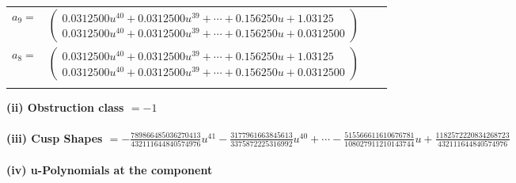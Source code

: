 \documentclass[1p]{elsarticle_modified}
\theoremstyle{definition}
\begin{document}
\begin{tabular}{m{7pt} m{180pt} m{7pt} m{180pt} }
\flushright $a_{9}=$&$\begin{pmatrix}0.0312500 u^{40}+0.0312500 u^{39}+\cdots+0.156250 u+1.03125\\0.0312500 u^{40}+0.0312500 u^{39}+\cdots+0.156250 u+0.0312500\end{pmatrix}$ \\
\flushright $a_{8}=$&$\begin{pmatrix}0.0312500 u^{40}+0.0312500 u^{39}+\cdots+0.156250 u+1.03125\\0.0312500 u^{40}+0.0312500 u^{39}+\cdots+0.156250 u+0.0312500\end{pmatrix}$\\&\end{tabular}
\flushleft \textbf{(ii) Obstruction class $= -1$}\\~\\
\flushleft \textbf{(iii) Cusp Shapes $= -\frac{789866485036270413}{432111644840574976} u^{41}-\frac{3177961663845613}{3375872225316992} u^{40}+\cdots-\frac{515566611610676781}{108027911210143744} u+\frac{1182572220834268723}{432111644840574976}$}\\~\\
\newpage\renewcommand{\arraystretch}{1}
\flushleft \textbf{(iv) u-Polynomials at the component}\newline \\
\end{document}
